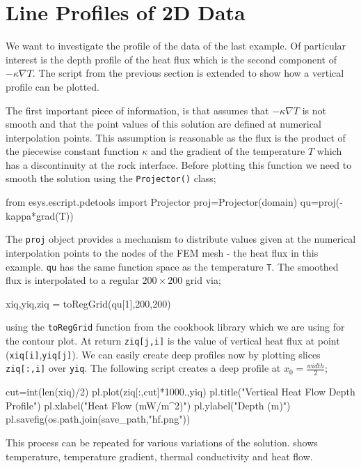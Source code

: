 \section{Line Profiles of 2D Data}
We want to investigate the profile of the data of the last example. 
Of particular interest is the depth profile of the heat flux which is the
second component of $-\kappa \nabla T$. The script from the previous section
is extended to show how a vertical profile can be plotted.

The first important piece of information, is that \esc assumes that $-\kappa
\nabla T$ is not smooth and that the point values of this solution are defined
at numerical interpolation points. This assumption is reasonable as
the flux is the product of the piecewise constant function $\kappa$ and 
the gradient of the temperature $T$ which has a discontinuity at the rock
interface.
Before plotting this function we need to smooth the solution using the
\verb|Projector()| class;
\begin{python}
from esys.escript.pdetools import Projector
proj=Projector(domain)
qu=proj(-kappa*grad(T))
\end{python}
The \verb|proj| object provides a mechanism to distribute values given at the
numerical interpolation points to the nodes of the FEM mesh - the heat flux in
this example. \verb|qu| has the same function space as the temperature
\verb|T|. The smoothed flux is interpolated to a regular $200\times 200$ grid
via;
\begin{python}
xiq,yiq,ziq = toRegGrid(qu[1],200,200)
\end{python}
using the \verb|toRegGrid| function from the cookbook library which we are
using for the contour plot.
At return \verb|ziq[j,i]| is the value of vertical heat flux at point
(\verb|xiq[i]|,\verb|yiq[j]|). We can easily create deep profiles now by
plotting slices \verb|ziq[:,i]| over \verb|yiq|. The following script
creates a deep profile at $x_{0}=\frac{width}{2}$;
\begin{python}
cut=int(len(xiq)/2)
pl.plot(ziq[:,cut]*1000.,yiq)
pl.title("Vertical Heat Flow Depth Profile")
pl.xlabel("Heat Flow (mW/m^2)")
pl.ylabel("Depth (m)")
pl.savefig(os.path.join(save_path,"hf.png"))
\end{python}
This process can be repeated for various variations of the solution.
 shows temperature, temperature gradient, thermal conductivity
and heat flow.

